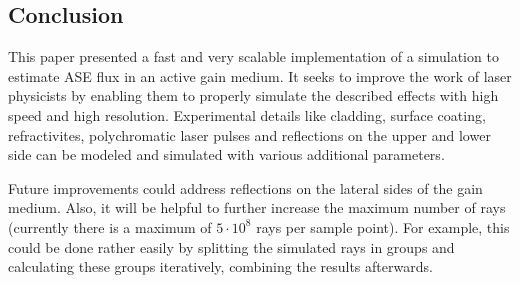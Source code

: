 \subsection{Conclusion}
\label{subsec:conclusion}
This paper presented a fast and very scalable implementation of a simulation to
estimate ASE flux in an active gain medium. It seeks to improve the work of
laser physicists by enabling them to properly simulate the described effects
with high speed and high resolution. Experimental details like cladding, surface
coating, refractivites, polychromatic laser pulses and reflections on the upper
and lower side can be modeled and simulated with various additional parameters.

Future improvements could address reflections on the lateral sides of the gain
medium. Also, it will be helpful to further increase the maximum number of rays
(currently there is a maximum of $5\cdot10^8$ rays per sample point). For
example, this could be done rather easily by splitting the simulated rays in
groups and calculating these groups iteratively, combining the results
afterwards.


